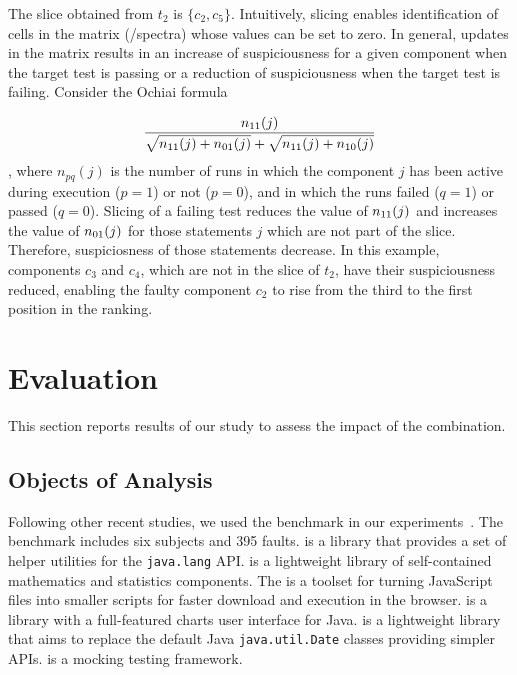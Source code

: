 \documentclass[sigplan,10pt,review,anonymous]{acmart}\settopmatter{printfolios=true,printccs=false,printacmref=false}
\begin{document}
The slice obtained from $t_2$ is $\{c_2, c_5\}$.  Intuitively, slicing
enables identification of cells in the matrix (/spectra) whose values
can be set to zero. In general, updates in the matrix results in an
increase of suspiciousness for a given component when the target test
is passing or a reduction of suspiciousness when the target test is
failing. Consider the Ochiai formula~\cite{DBLP:conf/prdc/AbreuZG06}

\[
\frac{\N{11}}{\sqrt{\N{11}+\N{01}} + \sqrt{\N{11}+\N{10}}}
\vspace{1ex}\], where $n_{pq}(j)$ is the number of runs in which the
component $j$ has been active during execution ($p = 1$) or not
($p=0$), and in which the runs failed ($q = 1$) or passed ($q = 0$).
Slicing of a failing test reduces the value of $n_{11}(j)$ and increases
the value of $n_{01}(j)$ for those statements $j$ which are not part of
the slice. Therefore, suspiciosness of those statements decrease. In
this example, components $c_3$ and $c_4$, which are not in the slice
of $t_2$, have their suspiciousness reduced, enabling the faulty
component $c_2$ to rise from the third to the first position in the
ranking.



\section{Evaluation}
\label{sec:eval}

This section reports results of our study to assess the impact of the
\comb{} combination.

\subsection{Objects of Analysis}

Following other recent studies, we used the \dfj{} benchmark in our
experiments~\cite{just-defects4j-issta2014}. The \dfj{} benchmark
includes six subjects and 395 faults.
\lang{} is a library
that provides a set of helper utilities for the {\small\texttt{java.lang}}
API. \cmath{} is a lightweight library of self-contained
mathematics and statistics components. The \closure{} is a toolset for
turning JavaScript files into smaller scripts for faster
download and execution in the browser. \chart{} is a library with a
full-featured charts user interface for Java. \jtime{} is a
lightweight library that aims to replace the default Java
{\small\texttt{java.util.Date}} classes providing simpler APIs. \mockito{} is
a mocking testing framework.
\end{document}
